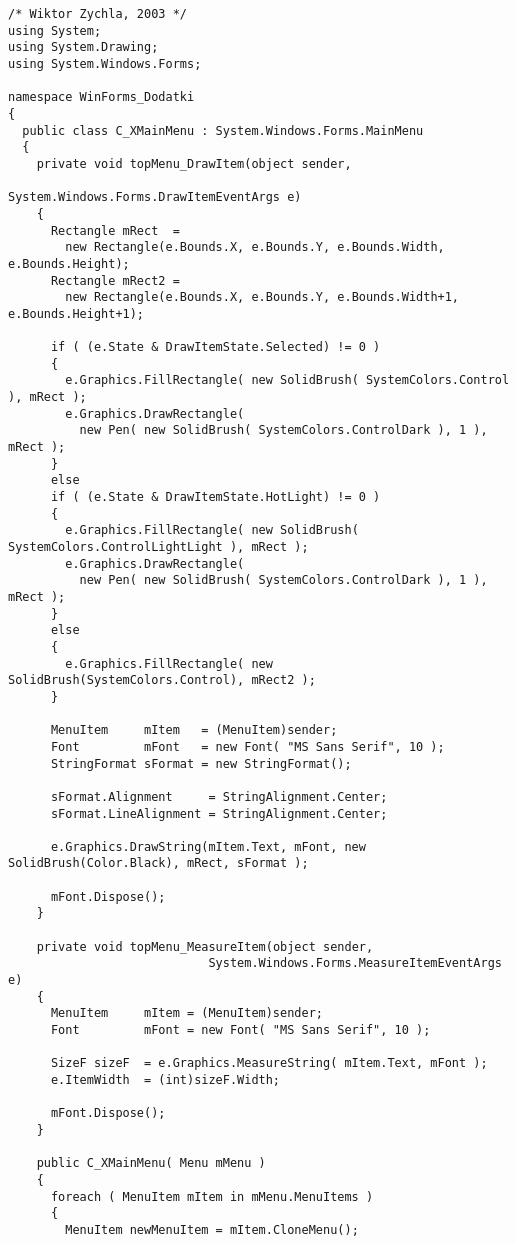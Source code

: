 \begin{scriptsize}
\begin{verbatim}
/* Wiktor Zychla, 2003 */
using System;
using System.Drawing;
using System.Windows.Forms;

namespace WinForms_Dodatki
{
  public class C_XMainMenu : System.Windows.Forms.MainMenu 
  {
    private void topMenu_DrawItem(object sender, 
                                  System.Windows.Forms.DrawItemEventArgs e)
    {
      Rectangle mRect  = 
        new Rectangle(e.Bounds.X, e.Bounds.Y, e.Bounds.Width, e.Bounds.Height);
      Rectangle mRect2 = 
        new Rectangle(e.Bounds.X, e.Bounds.Y, e.Bounds.Width+1, e.Bounds.Height+1);

      if ( (e.State & DrawItemState.Selected) != 0 )  
      {
        e.Graphics.FillRectangle( new SolidBrush( SystemColors.Control ), mRect );
        e.Graphics.DrawRectangle( 
          new Pen( new SolidBrush( SystemColors.ControlDark ), 1 ), mRect );
      }
      else
      if ( (e.State & DrawItemState.HotLight) != 0 ) 
      {
        e.Graphics.FillRectangle( new SolidBrush( SystemColors.ControlLightLight ), mRect );
        e.Graphics.DrawRectangle( 
          new Pen( new SolidBrush( SystemColors.ControlDark ), 1 ), mRect );
      }
      else
      {
        e.Graphics.FillRectangle( new SolidBrush(SystemColors.Control), mRect2 );
      }
						
      MenuItem     mItem   = (MenuItem)sender;
      Font         mFont   = new Font( "MS Sans Serif", 10 );
      StringFormat sFormat = new StringFormat();
			
      sFormat.Alignment     = StringAlignment.Center;
      sFormat.LineAlignment = StringAlignment.Center;

      e.Graphics.DrawString(mItem.Text, mFont, new SolidBrush(Color.Black), mRect, sFormat );

      mFont.Dispose();
    }

    private void topMenu_MeasureItem(object sender, 
                            System.Windows.Forms.MeasureItemEventArgs e)
    {
      MenuItem     mItem = (MenuItem)sender;
      Font         mFont = new Font( "MS Sans Serif", 10 );

      SizeF sizeF  = e.Graphics.MeasureString( mItem.Text, mFont );			
      e.ItemWidth  = (int)sizeF.Width;

      mFont.Dispose();
    }

    public C_XMainMenu( Menu mMenu ) 
    {
      foreach ( MenuItem mItem in mMenu.MenuItems )
      {				
        MenuItem newMenuItem = mItem.CloneMenu();
				

\end{verbatim}
\end{scriptsize}
